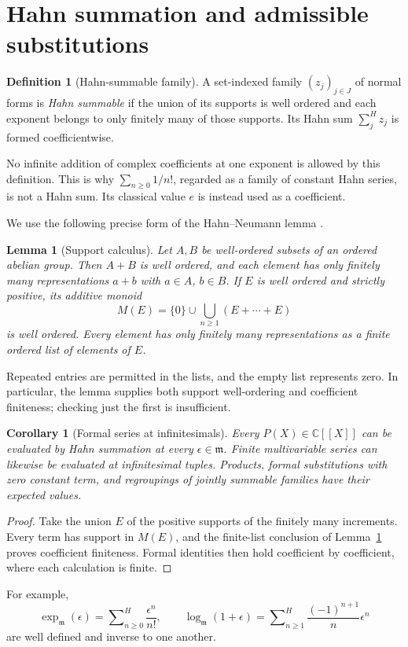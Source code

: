 \documentclass[11pt,a4paper]{article}
\newtheorem{lemma}[theorem]{Lemma}
\newtheorem{corollary}[theorem]{Corollary}
\theoremstyle{definition}
\newtheorem{definition}[theorem]{Definition}
\theoremstyle{remark}
\newcommand{\C}{\mathbb C}
\newcommand{\mm}{\mathfrak m}
\newcommand{\Hs}{\mathop{\sum}\nolimits^{\!H}}
\begin{document}
\section{Hahn summation and admissible substitutions}\label{sec:sums}
\begin{definition}[Hahn-summable family]\label{def:summable}
A set-indexed family $(z_j)_{j\in J}$ of normal forms is
\emph{Hahn summable} if the union of its supports is well ordered and
each exponent belongs to only finitely many of those supports. Its
Hahn sum $\Hs_j z_j$ is formed coefficientwise.
\end{definition}
No infinite addition of complex coefficients at one exponent is allowed
by this definition. This is why $\sum_{n\ge0}1/n!$, regarded as a
family of constant Hahn series, is not a Hahn sum. Its classical value
$e$ is instead used as a coefficient.

We use the following precise form of the Hahn--Neumann lemma
\cite{Neumann,PoonenUnits}.
\begin{lemma}[Support calculus]\label{lem:neumann}
Let $A,B$ be well-ordered subsets of an ordered abelian group. Then
$A+B$ is well ordered, and each element has only finitely many
representations $a+b$ with $a\in A$, $b\in B$. If $E$ is well
ordered and strictly positive, its additive monoid
\[
 M(E)=\{0\}\cup\bigcup_{n\ge1}(E+\cdots+E)
\]
is well ordered. Every element has only finitely many representations
as a finite ordered list of elements of $E$.
\end{lemma}
Repeated entries are permitted in the lists, and the empty list represents
zero. In particular, the lemma supplies both support well-ordering and
coefficient finiteness; checking just the first is insufficient.

\begin{corollary}[Formal series at infinitesimals]\label{cor:formalcomplex}
Every $P(X)\in\C[[X]]$ can be evaluated by Hahn summation at every
$\epsilon\in\mm$. Finite multivariable series can likewise be
evaluated at infinitesimal tuples. Products, formal substitutions with
zero constant term, and regroupings of jointly summable families have
their expected values.
\end{corollary}
\begin{proof}
Take the union $E$ of the positive supports of the finitely many
increments. Every term has support in $M(E)$, and the finite-list
conclusion of Lemma~\ref{lem:neumann} proves coefficient finiteness.
Formal identities then hold coefficient by coefficient, where each
calculation is finite.
\end{proof}
For example,
\[
 \exp_{\mm}(\epsilon)=\Hs_{n\ge0}\frac{\epsilon^n}{n!},
 \qquad
 \log_{\mm}(1+\epsilon)=\Hs_{n\ge1}
 \frac{(-1)^{n+1}}{n}\epsilon^n
\]
are well defined and inverse to one another.
\end{document}
